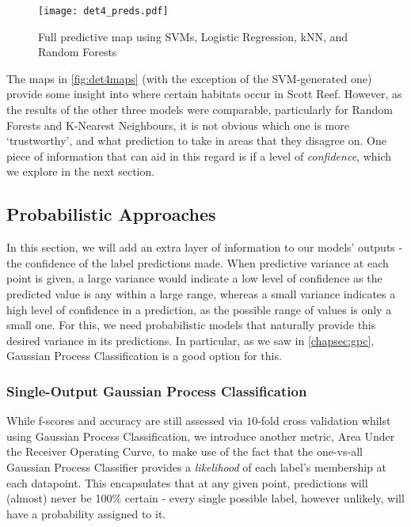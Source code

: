 \begin{figure}[H]
    \texttt{[image: det4\_preds.pdf]}
    \caption{Full predictive map using SVMs, Logistic Regression, kNN, and Random Forests}
    \label{fig:det4maps}
\end{figure}

The maps in \autoref{fig:det4maps} (with the exception of the SVM-generated one) provide some insight into where certain habitats occur in Scott Reef. However, as the results of the other three models were comparable, particularly for Random Forests and K-Nearest Neighbours, it is not obvious which one is more `trustworthy', and what prediction to take in areas that they disagree on. One piece of information that can aid in this regard is if a level of \textit{confidence}, which we explore in the next section.

\subsection{Probabilistic Approaches}

In this section, we will add an extra layer of information to our models' outputs - the confidence of the label predictions made. When predictive variance at each point is given, a large variance would indicate a low level of confidence as the predicted value is any within a large range, whereas a small variance indicates a high level of confidence in a prediction, as the possible range of values is only a small one. For this, we need probabilistic models that naturally provide this desired variance in its predictions. In particular, as we saw in \autoref{chapsec:gpc}, Gaussian Process Classification is a good option for this.

\subsubsection{Single-Output Gaussian Process Classification}

While f-scores and accuracy are still assessed via $10$-fold cross validation whilst using Gaussian Process Classification, we introduce another metric, Area Under the Receiver Operating Curve, to make use of the fact that the one-vs-all Gaussian Process Classifier provides a \textit{likelihood} of each label's membership at each datapoint. This encapsulates that at any given point, predictions will (almost) never be 100\% certain - every single possible label, however unlikely, will have a probability assigned to it. 


